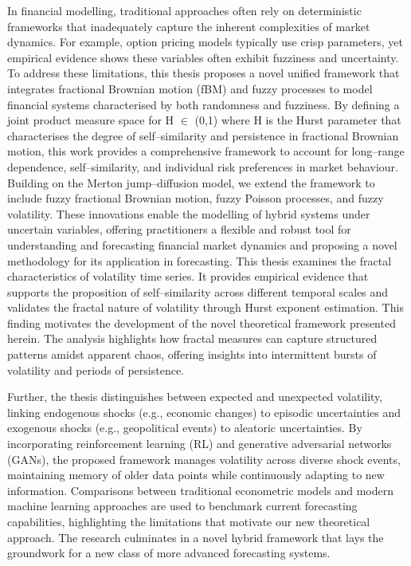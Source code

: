 \documentclass[12pt,a4paper]{report}
\numberwithin{equation}{section}
\begin{document}
In financial modelling, traditional approaches often rely on
deterministic frameworks that inadequately capture the inherent
complexities of market dynamics. For example, option pricing models
typically use crisp parameters, yet empirical evidence shows these
variables often exhibit fuzziness and uncertainty. To address these
limitations, this thesis proposes a novel unified framework that
integrates fractional Brownian motion (fBM) and fuzzy processes to model
financial systems characterised by both randomness and fuzziness. By
defining a joint product measure space for H $\in$ (0,1) where H is the
Hurst parameter that characterises the degree of self--similarity and
persistence in fractional Brownian motion, this work provides a
comprehensive framework to account for long--range dependence,
self--similarity, and individual risk preferences in market behaviour.
Building on the Merton jump--diffusion model, we extend the framework to
include fuzzy fractional Brownian motion, fuzzy Poisson processes, and
fuzzy volatility. These innovations enable the modelling of hybrid
systems under uncertain variables, offering practitioners a flexible and
robust tool for understanding and forecasting financial market dynamics
and proposing a novel methodology for its application in forecasting.
This thesis examines the fractal characteristics of volatility time
series. It provides empirical evidence that supports the proposition of
self--similarity across different temporal scales and validates the
fractal nature of volatility through Hurst exponent estimation. This
finding motivates the development of the novel theoretical framework
presented herein. The analysis highlights how fractal measures can
capture structured patterns amidst apparent chaos, offering insights
into intermittent bursts of volatility and periods of persistence.

Further, the thesis distinguishes between expected and unexpected
volatility, linking endogenous shocks (e.g., economic changes) to
episodic uncertainties and exogenous shocks (e.g., geopolitical events)
to aleatoric uncertainties. By incorporating reinforcement learning (RL)
and generative adversarial networks (GANs), the proposed framework
manages volatility across diverse shock events, maintaining memory of
older data points while continuously adapting to new information.
Comparisons between traditional econometric models and modern machine
learning approaches are used to benchmark current forecasting
capabilities, highlighting the limitations that motivate our new
theoretical approach. The research culminates in a novel hybrid
framework that lays the groundwork for a new class of more advanced
forecasting systems.
\end{document}
